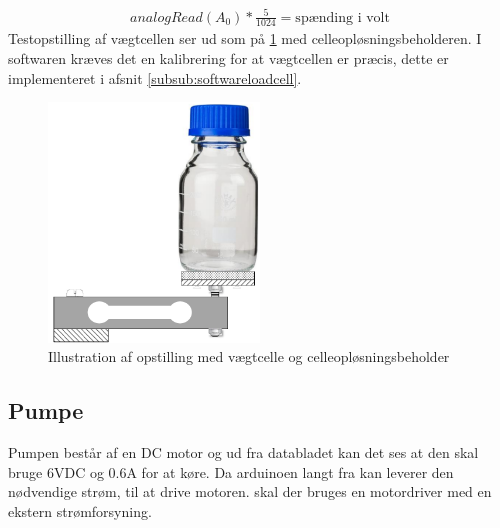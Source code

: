  \begin{align}
 analogRead(A_0)*\frac{5}{1024}=\text{spænding i volt}
 \label{eq:trintilvolt}
 \end{align}
Testopstilling af vægtcellen ser ud som på \ref{fig:loadcell_mont} med celleopløsningsbeholderen. I softwaren kræves det en kalibrering for at vægtcellen er præcis, dette er implementeret i afsnit \ref{subsub:softwareloadcell}.
 
 \begin{figure}[H]
	\centering
	\includegraphics[width=0.5\textwidth]{billeder/Hardware/diagrammer/loadcell_montering.pdf}
	\caption{Illustration af opstilling med vægtcelle og celleopløsningsbeholder}
	\label{fig:loadcell_mont}
\end{figure}

 \subsection{Pumpe}
 Pumpen består af en DC motor og ud fra databladet kan det ses at den skal bruge 6VDC og 0.6A for at køre. Da arduinoen langt fra kan leverer den nødvendige strøm, til at drive motoren. skal der bruges en motordriver med en ekstern strømforsyning.
